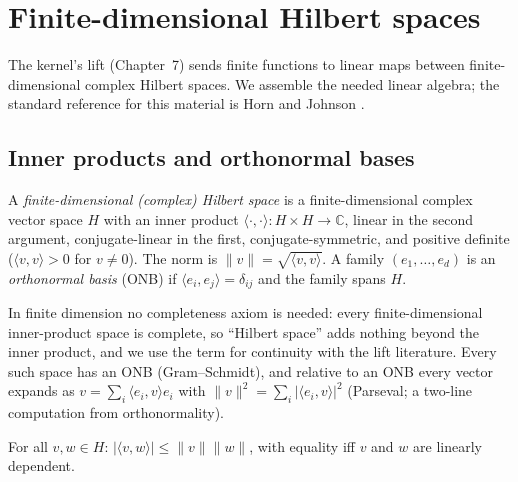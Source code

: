 \section{Finite-dimensional Hilbert spaces}\label{ch02:sec:hilbert}

The kernel's lift (Chapter~7) sends finite functions to linear maps between
finite-dimensional complex Hilbert spaces. We assemble the needed linear
algebra; the standard reference for this material is Horn and Johnson
\cite{horn}.

\subsection{Inner products and orthonormal bases}

\begin{definition}\label{ch02:def:hilbert}
A \emph{finite-dimensional (complex) Hilbert space} is a finite-dimensional
complex vector space $H$ with an inner product
$\langle \cdot, \cdot \rangle : H \times H \to \mathbb{C}$, linear in the
second argument, conjugate-linear in the first, conjugate-symmetric, and
positive definite ($\langle v, v \rangle > 0$ for $v \neq 0$). The norm is
$\lVert v \rVert = \sqrt{\langle v, v \rangle}$. A family
$(e_1, \dots, e_d)$ is an \emph{orthonormal basis} (ONB) if
$\langle e_i, e_j \rangle = \delta_{ij}$ and the family spans $H$.
\end{definition}

In finite dimension no completeness axiom is needed: every
finite-dimensional inner-product space is complete, so ``Hilbert space''
adds nothing beyond the inner product, and we use the term for continuity
with the lift literature. Every such space has an ONB (Gram--Schmidt), and
relative to an ONB every vector expands as
$v = \sum_i \langle e_i, v \rangle e_i$ with
$\lVert v \rVert^2 = \sum_i |\langle e_i, v \rangle|^2$ (Parseval; a
two-line computation from orthonormality).

\begin{proposition}\label{ch02:prop:cauchy-schwarz}
For all $v, w \in H$: $|\langle v, w \rangle| \leq \lVert v \rVert
\lVert w \rVert$, with equality iff $v$ and $w$ are linearly dependent.
\end{proposition}

